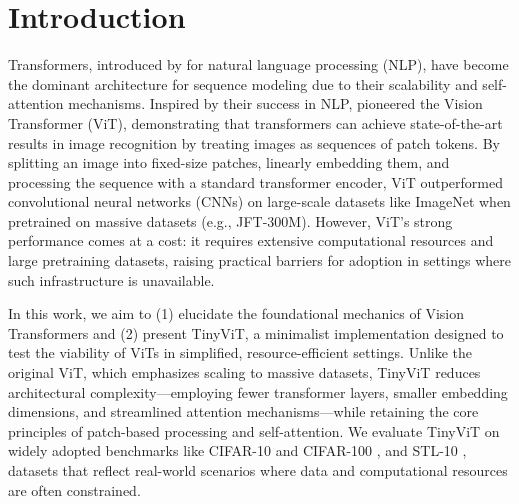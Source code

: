 \section{Introduction}

Transformers, introduced by \cite{vaswani2017attention} for natural language processing (NLP), have become the dominant architecture for sequence modeling due to their scalability and self-attention mechanisms. Inspired by their success in NLP, \cite{alexey2020image} pioneered the Vision Transformer (ViT), demonstrating that transformers can achieve state-of-the-art results in image recognition by treating images as sequences of patch tokens. By splitting an image into fixed-size patches, linearly embedding them, and processing the sequence with a standard transformer encoder, ViT outperformed convolutional neural networks (CNNs) \cite{he2016deep} on large-scale datasets like ImageNet when pretrained on massive datasets (e.g., JFT-300M). However, ViT’s strong performance comes at a cost: it requires extensive computational resources and large pretraining datasets, raising practical barriers for adoption in settings where such infrastructure is unavailable.

In this work, we aim to (1) elucidate the foundational mechanics of Vision Transformers and (2) present TinyViT, a minimalist implementation designed to test the viability of ViTs in simplified, resource-efficient settings. Unlike the original ViT, which emphasizes scaling to massive datasets, TinyViT reduces architectural complexity—employing fewer transformer layers, smaller embedding dimensions, and streamlined attention mechanisms—while retaining the core principles of patch-based processing and self-attention. We evaluate TinyViT on widely adopted benchmarks like CIFAR-10 and CIFAR-100 \cite{krizhevsky2009learning}, and STL-10 \cite{coates2011analysis}, datasets that reflect real-world scenarios where data and computational resources are often constrained.